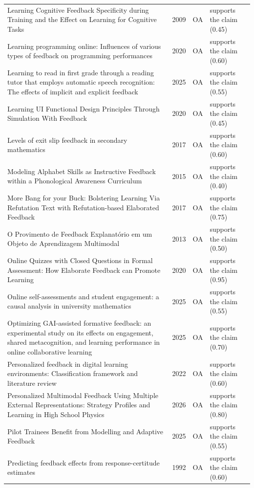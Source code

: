 \begin{longtable}{@{}%
  >{\raggedright\arraybackslash}p{}c%
  >{\raggedright\arraybackslash}p{}%
  >{\raggedright\arraybackslash}p{}@{}}
Learning Cognitive Feedback Specificity during Training and the Effect on Learning for Cognitive Tasks & 2009 & OA & supports the claim (0.45) \\
Learning programming online: Influences of various types of feedback on programming performances & 2020 & OA & supports the claim (0.60) \\
Learning to read in first grade through a reading tutor that employs automatic speech recognition: The effects of implicit and explicit feedback & 2025 & OA & supports the claim (0.55) \\
Learning UI Functional Design Principles Through Simulation With Feedback & 2020 & OA & supports the claim (0.45) \\
Levels of exit slip feedback in secondary mathematics & 2017 & OA & supports the claim (0.60) \\
Modeling Alphabet Skills as Instructive Feedback within a Phonological Awareness Curriculum & 2015 & OA & supports the claim (0.40) \\
More Bang for your Buck: Bolstering Learning Via Refutation Text with Refutation-based Elaborated Feedback & 2017 & OA & supports the claim (0.75) \\
O Provimento de Feedback Explanatório em um Objeto de Aprendizagem Multimodal & 2013 & OA & supports the claim (0.50) \\
Online Quizzes with Closed Questions in Formal Assessment: How Elaborate Feedback can Promote Learning & 2020 & OA & supports the claim (0.95) \\
Online self-assessments and student engagement: a causal analysis in university mathematics & 2025 & OA & supports the claim (0.55) \\
Optimizing GAI-assisted formative feedback: an experimental study on its effects on engagement, shared metacognition, and learning performance in online collaborative learning & 2025 & OA & supports the claim (0.70) \\
Personalized feedback in digital learning environments: Classification framework and literature review & 2022 & OA & supports the claim (0.60) \\
Personalized Multimodal Feedback Using Multiple External Representations: Strategy Profiles and Learning in High School Physics & 2026 & OA & supports the claim (0.80) \\
Pilot Trainees Benefit from Modelling and Adaptive Feedback & 2025 & OA & supports the claim (0.55) \\
Predicting feedback effects from response-certitude estimates & 1992 & OA & supports the claim (0.60) \\

\end{longtable}
